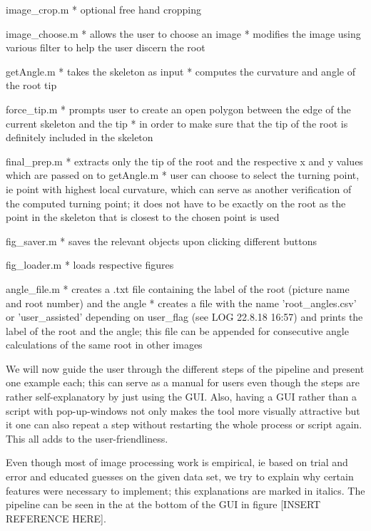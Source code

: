 image_crop.m
* optional free hand cropping

image_choose.m
* allows the user to choose an image
* modifies the image using various filter to help the user discern the root

getAngle.m
* takes the skeleton as input
* computes the curvature and angle of the root tip

force_tip.m
* prompts user to create an open polygon between the edge of the current skeleton and the tip 
* in order to make sure that the tip of the root is definitely included in the skeleton 

final_prep.m
* extracts only the tip of the root and the respective x and y values which are passed on to getAngle.m
* user can choose to select the turning point, ie point with highest local curvature, which can serve as another verification of the computed turning point; it does not have to be exactly on the root as the point in the skeleton that is closest to the chosen point is used

fig_saver.m
* saves the relevant objects upon clicking different buttons

fig_loader.m
* loads respective figures



angle_file.m
* creates a .txt file containing the label of the root (picture name and root number) and the angle
* creates a file with the name 'root_angles.csv' or 'user_assisted' depending on user_flag (see LOG 22.8.18 16:57) and prints the label of the root and the angle; this file can be appended for consecutive angle calculations of the same root in other images




We will now guide the user through the different steps of the pipeline and present one example each; this can serve as a manual for users even though the steps are rather self-explanatory by just using the GUI. Also, having a GUI rather than a script with pop-up-windows not only makes the tool more visually attractive but it one can also repeat a step without restarting the whole process or script again. This all adds to the user-friendliness.

Even though most of image processing work is empirical, ie based on trial and error and educated guesses on the given data set, we try to explain why certain features were necessary to implement; this explanations are marked in italics.
The pipeline can be seen in the at the bottom of the GUI in figure [INSERT REFERENCE HERE].

